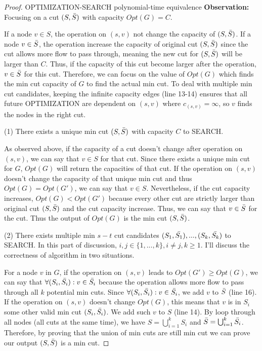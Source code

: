\documentclass[openany]{article}
\begin{document}
\begin{proof}{}{OPTIMIZATION-SEARCH polynomial-time equivalence}
\textbf{Observation:} Focusing on a cut $(S,\Bar{S})$ with capacity $Opt(G) = C$.

If a node $v\in S$, the operation on $(s,v)$ not change the capacity of $(S,\Bar{S})$. If a node $v \in \Bar{S}$, the operation increase the capacity of original cut $(S,\Bar{S})$ since the cut allows more flow to pass through, meaning the new cut for $(S,\Bar{S})$ will be larger than $C$. Thus, if the capacity of this cut become larger after the operation, $v \in \Bar{S}$ for this cut. Therefore, we can focus on the value of $Opt(G)$ which finds the min cut capacity of $G$ to find the actual min cut. To deal with multiple min cut candidates, keeping the infinite capacity edges (line 13-14) ensures that all future OPTIMIZATION are dependent on $(s,v)$ where $c_{(s,v)}=\infty$, so $v$ finds the nodes in the right cut. 

(1) There exists a unique min cut $(S,\Bar{S})$ with capacity $C$ to SEARCH.

As observed above, if the capacity of a cut doesn't change after operation on $(s,v)$, we can say that $v\in S$ for that cut. Since there exists a unique min cut for $G$, $Opt(G)$ will return the capacities of that cut. If the operation on $(s,v)$ doesn't change the capacity of that unique min cut and thus $Opt(G) = Opt(G')$, we can say that $v\in S$. Nevertheless, if the cut capacity increases, $Opt(G) < Opt(G')$ because every other cut are strictly larger than original cut $(S,\Bar{S})$ and the cut capacity increase. Thus, we can say that $v \in \Bar{S}$ for the cut. Thus the output of $Opt(G)$ is the min cut $(S,\Bar{S})$.

(2) There exists multiple min $s-t$ cut candidates $(S_1,\Bar{S_1}), ... , (S_k,\Bar{S_k})$ to SEARCH. In this part of discussion, $i,j \in \{1,...,k\}, i\neq j, k \geqslant 1$. I'll discuss the correctness of algorithm in two situations.

For a node $v$ in $G$, if the operation on $(s,v)$ leads to $Opt(G') \geqslant Opt(G)$, we can say that $\forall (S_i, \Bar{S_i}): v \in \Bar{S_i}$ because the operation allows more flow to pass through all $k$ potential min cuts. Since $\forall (S_i, \Bar{S_i}): v\in \Bar{S_i}$, we add $v$ to $\Bar{S}$ (line 16). If the operation on $(s,v)$ doesn't change $Opt(G)$, this means that $v$ is in $S_i$ some other valid min cut $(S_i,\Bar{S_i})$. We add such $v$ to $S$ (line 14). By loop through all nodes (all cuts at the same time), we have $S = \bigcup_{i=1}^{k}S_i$ and $\Bar{S} = \bigcup_{i=1}^{k}\Bar{S_i}$. Therefore, by proving that the union of min cuts are still min cut we can prove our output $(S,\Bar{S})$ is a min cut.


\end{proof}
\end{document}
